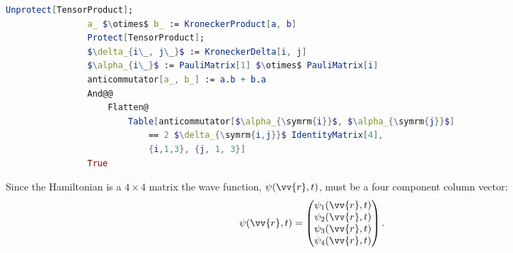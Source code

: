 \documentclass[fleqn]{NotesClass}
\begin{document}
\begin{appendices}
        \begin{cde}{}{}
            \begin{lstlisting}[gobble=16, language=mathematica, mathescape]
                Unprotect[TensorProduct];
                a_ $\otimes$ b_ := KroneckerProduct[a, b]
                Protect[TensorProduct];
                $\delta_{i\_, j\_}$ := KroneckerDelta[i, j]
                $\alpha_{i\_}$ := PauliMatrix[1] $\otimes$ PauliMatrix[i]
                anticommutator[a_, b_] := a.b + b.a
                And@@
                    Flatten@
                        Table[anticommutator[$\alpha_{\symrm{i}}$, $\alpha_{\symrm{j}}$]
                            == 2 $\delta_{\symrm{i,j}}$ IdentityMatrix[4],
                            {i,1,3}, {j, 1, 3}]
                True
            \end{lstlisting}
        \end{cde}
        
        Since the Hamiltonian is a \(4 \times 4\) matrix the wave function, \(\psi(\vv{r}, t)\), must be a four component column vector:
        \begin{equation}
            \psi(\vv{r}, t) = 
            \begin{pmatrix}
                \psi_1(\vv{r}, t)\\ \psi_2(\vv{r}, t)\\ \psi_3(\vv{r}, t)\\ \psi_4(\vv{r}, t)\\
            \end{pmatrix}
            .
        \end{equation}
        

\end{appendices}
\end{document}

